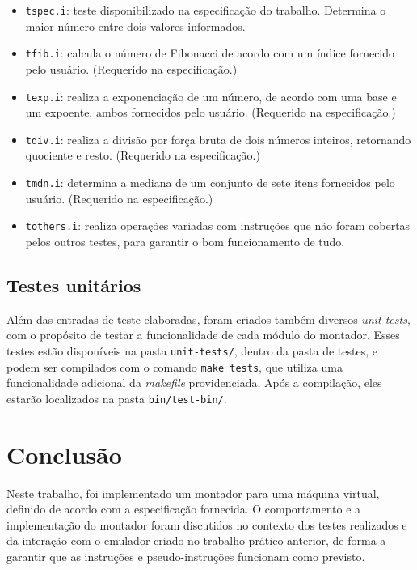 \documentclass[10pt,a4paper]{article}
\numberwithin{equation}{section}
\begin{document}
\begin{itemize}
    \item \verb|tspec.i|: teste disponibilizado na especificação do trabalho. Determina o maior número entre dois valores informados.
    \item \verb|tfib.i|: calcula o número de Fibonacci de acordo com um índice fornecido pelo usuário. (Requerido na especificação.)
    \item \verb|texp.i|: realiza a exponenciação de um número, de acordo com uma base e um expoente, ambos fornecidos pelo usuário. (Requerido na especificação.)
    \item \verb|tdiv.i|: realiza a divisão por força bruta de dois números inteiros, retornando quociente e resto. (Requerido na especificação.)
    \item \verb|tmdn.i|: determina a mediana de um conjunto de sete itens fornecidos pelo usuário. (Requerido na especificação.)
    \item \verb|tothers.i|: realiza operações variadas com instruções que não foram cobertas pelos outros testes, para garantir o bom funcionamento de tudo.
\end{itemize}

\subsection{Testes unitários}

Além das entradas de teste elaboradas, foram criados também diversos \emph{unit tests}, com o propósito de testar a funcionalidade de cada módulo do montador. Esses testes estão disponíveis na pasta \verb|unit-tests/|, dentro da pasta de testes, e podem ser compilados com o comando \verb|make tests|, que utiliza uma funcionalidade adicional da \emph{makefile} providenciada. Após a compilação, eles estarão localizados na pasta \verb|bin/test-bin/|.

\section{Conclusão}

Neste trabalho, foi implementado um montador para uma máquina virtual, definido de acordo com a especificação fornecida. O comportamento e a implementação do montador foram discutidos no contexto dos testes realizados e da interação com o emulador criado no trabalho prático anterior, de forma a garantir que as instruções e pseudo-instruções funcionam como previsto.
\end{document}
